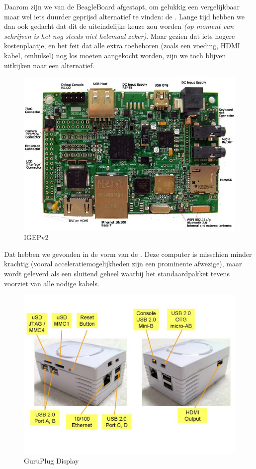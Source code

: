 \documentclass[verslag.tex]{subfiles}
\begin{document}
Daarom zijn we van de BeagleBoard afgestapt, om gelukkig een vergelijkbaar maar wel iets duurder geprijsd alternatief te vinden: de . Lange tijd hebben we dan ook gedacht dat dit de uiteindelijke keuze zou worden \textit{(op moment van schrijven is het nog steeds niet helemaal zeker)}. Maar gezien dat iets hogere kostenplaatje, en het feit dat alle extra toebehoren (zoals een voeding, HDMI kabel, omhulsel) nog los moeten aangekocht worden, zijn we toch blijven uitkijken naar een alternatief.

\begin{figure}
	\includegraphics[width=\textwidth]{afbeeldingen/IGEPv2}
	\caption{IGEPv2}
\end{figure}

Dat hebben we gevonden in de vorm van de . Deze computer is misschien minder krachtig (vooral acceleratiemogelijkheden zijn een prominente afwezige), maar wordt geleverd als een sluitend geheel waarbij het standaardpakket tevens voorziet van alle nodige kabels.

\begin{figure}
	\includegraphics[width=\textwidth]{afbeeldingen/GuruPlug_Display}
	\caption{GuruPlug Display}
\end{figure}
\end{document}
